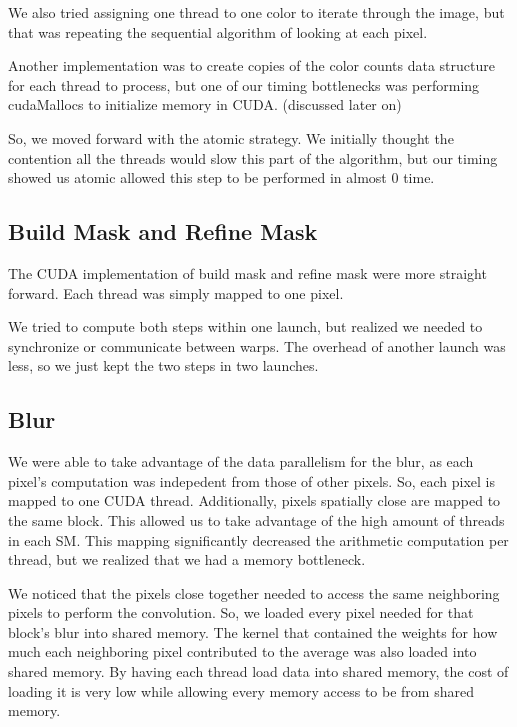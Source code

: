 \documentclass[12pt]{article}
\begin{document}
We also tried assigning one thread to one color to iterate through the image,
but that was repeating the sequential algorithm of looking at each pixel.

Another implementation was to create copies of the color counts data structure
for each thread to process, but one of our timing bottlenecks was performing
cudaMallocs to initialize memory in CUDA. (discussed later on)

So, we moved forward with the atomic strategy. We initially thought the
contention all the threads would slow this part of the algorithm, but our
timing showed us atomic allowed this step to be performed in almost 0 time.

\subsection{Build Mask and Refine Mask}
The CUDA implementation of build mask and refine mask were more straight
forward. Each thread was simply mapped to one pixel.

We tried to compute both steps within one launch, but realized we needed to
synchronize or communicate between warps. The overhead of another launch was
less, so we just kept the two steps in two launches.

\subsection{Blur}
We were able to take advantage of the data parallelism for the blur, as each
pixel's computation was indepedent from those of other pixels. So, each pixel
is mapped to one CUDA thread. Additionally, pixels spatially close are mapped to
the same block. This allowed us to take advantage of the high
amount of threads in each SM. This mapping significantly decreased the
arithmetic computation per thread, but we realized that we had a memory
bottleneck.

We noticed that the pixels close together needed to access the same neighboring
pixels to perform the convolution. So, we loaded every pixel needed for that
block's blur into shared memory. The kernel that contained the weights for how
much each neighboring pixel contributed to the average was also loaded into
shared memory. By having each thread load data into shared
memory, the cost of loading it is very low while allowing every memory
access to be from shared memory.
\end{document}
